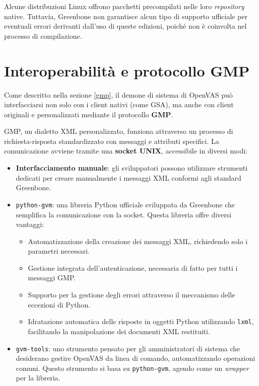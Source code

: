 Alcune distribuzioni Linux offrono pacchetti precompilati nelle loro \emph{repository} native. Tuttavia, Greenbone non garantisce alcun tipo di supporto ufficiale per eventuali errori derivanti dall'uso di queste edizioni, poiché non è coinvolta nel processo di compilazione.

\section{Interoperabilità e protocollo GMP}
\label{libraries}
Come descritto nella sezione \ref{gmp}, il demone di sistema di OpenVAS può interfacciarsi non solo con i client nativi (come GSA), ma anche con client originali e personalizzati mediante il protocollo \textbf{GMP}.

GMP, un dialetto XML personalizzato, funziona attraverso un processo di richiesta-risposta standardizzato con messaggi e attributi specifici. La comunicazione avviene tramite una \textbf{socket UNIX}, accessibile in diversi modi:

\begin{itemize}
    \item \textbf{Interfacciamento manuale}: gli sviluppatori possono utilizzare strumenti dedicati per creare manualmente i messaggi XML conformi agli standard Greenbone.

    \item \texttt{python-gvm}: una libreria Python ufficiale sviluppata da Greenbone che semplifica la comunicazione con la socket. Questa libreria offre diversi vantaggi:
    \begin{itemize}
        \item Automatizzazione della creazione dei messaggi XML, richiedendo solo i parametri necessari.
        \item Gestione integrata dell'autenticazione, necessaria di fatto per tutti i messaggi GMP.
        \item Supporto per la gestione degli errori attraverso il meccanismo delle eccezioni di Python.
        \item Idratazione automatica delle risposte in oggetti Python utilizzando \texttt{lxml}, facilitando la manipolazione dei documenti XML restituiti.
    \end{itemize}

    \item \texttt{gvm-tools}: uno strumento pensato per gli amministratori di sistema che desiderano gestire OpenVAS da linea di comando, automatizzando operazioni comuni. Questo strumento si basa su \texttt{python-gvm}, agendo come un \emph{wrapper} per la libreria.
\end{itemize}


